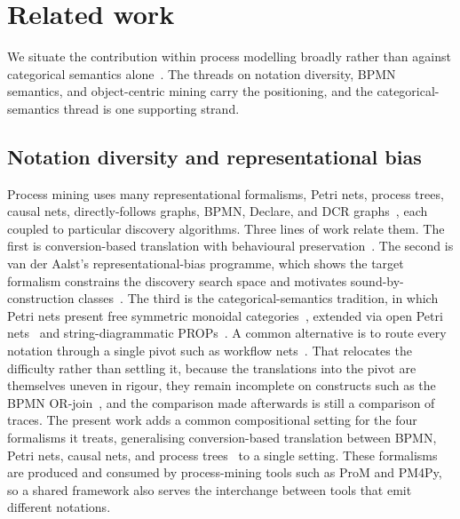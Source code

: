 \section{Related work}\label{sec:related-work}

We situate the contribution within process modelling broadly rather than against categorical semantics alone~\cite{chechikFormalMethodsScope2025}. The threads on notation diversity, BPMN semantics, and object-centric mining carry the positioning, and the categorical-semantics thread is one supporting strand.

\subsection{Notation diversity and representational bias}

Process mining uses many representational formalisms, Petri nets, process trees, causal nets,
directly-follows graphs, BPMN, Declare, and DCR graphs~\cite{deboisDeclarativeProcessMining2017},
each coupled to particular discovery algorithms. Three lines of work relate them. The first is
conversion-based translation with behavioural
preservation~\cite{kalenkovaProcessMiningUsing2017}. The second is van der Aalst's
representational-bias programme, which shows the target formalism constrains the discovery search
space and motivates sound-by-construction
classes~\cite{vanderaalstRepresentationalBiasProcess2011,%
  vanderaalstImprovingRepresentationalBias2012,%
  vanderaalstUsingFreeChoiceNets2021,%
vanderaalstFoundationsProcessDiscovery2022}. The third is the categorical-semantics tradition, in which Petri
nets present free symmetric monoidal categories~\cite{meseguerPetriNetsAre1990}, extended via open
Petri nets~\cite{baezOpenPetriNets2020} and string-diagrammatic
PROPs~\cite{bonchiDiagrammaticAlgebraLinear2019}. A common alternative is to route every notation through a single pivot such as workflow
nets~\cite{vanderaalstVerificationWorkflowNets1997}. That relocates the difficulty rather than
settling it, because the translations into the pivot are themselves uneven in rigour, they remain
incomplete on constructs such as the BPMN OR-join~\cite{dijkmanSemanticsAnalysisBusiness2008}, and
the comparison made afterwards is still a comparison of traces.
The present work adds a common compositional setting for the four formalisms it treats,
generalising conversion-based translation between BPMN, Petri nets, causal nets, and process
trees~\cite{kalenkovaProcessMiningUsing2017} to a single setting. These formalisms are
produced and consumed by process-mining tools such as ProM and PM4Py, so a shared framework also
serves the interchange between tools that emit different notations.

